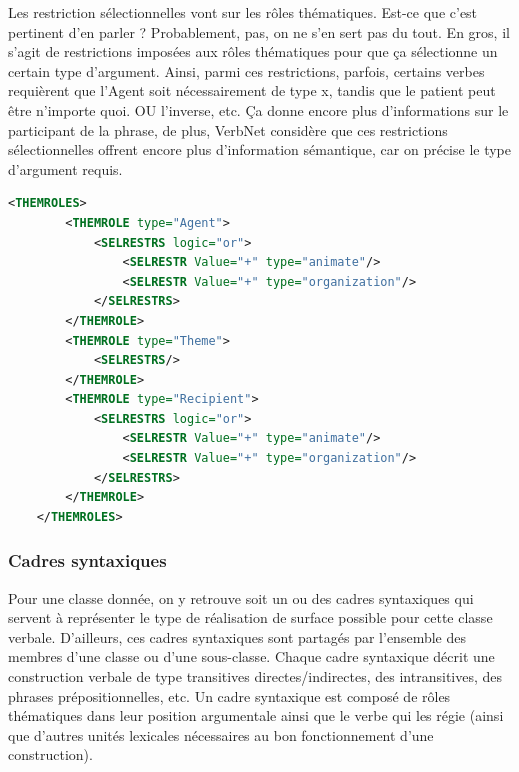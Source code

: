 Les restriction sélectionnelles vont sur les rôles thématiques. Est-ce que c'est pertinent d'en parler ? Probablement, pas, on ne s'en sert pas du tout.
En gros, il s'agit de restrictions imposées aux rôles thématiques pour que ça sélectionne un certain type d'argument. Ainsi, parmi ces restrictions, parfois, certains verbes requièrent que l'Agent soit nécessairement de type x, tandis que le patient peut être n'importe quoi. OU l'inverse, etc.
Ça donne encore plus d'informations sur le participant de la phrase, de plus, VerbNet considère que ces restrictions sélectionnelles offrent encore plus d'information sémantique, car on précise le type d'argument requis.
\begin{lstlisting}[language=Xml, caption = les restrictions sélectionnelles]
    <THEMROLES>
        <THEMROLE type="Agent">
            <SELRESTRS logic="or">
                <SELRESTR Value="+" type="animate"/>
                <SELRESTR Value="+" type="organization"/>
            </SELRESTRS>
        </THEMROLE>
        <THEMROLE type="Theme">
            <SELRESTRS/>
        </THEMROLE>
        <THEMROLE type="Recipient">
            <SELRESTRS logic="or">
                <SELRESTR Value="+" type="animate"/>
                <SELRESTR Value="+" type="organization"/>
            </SELRESTRS>
        </THEMROLE>
    </THEMROLES>
\end{lstlisting}

\subsubsection{Cadres syntaxiques}

Pour une classe donnée, on y retrouve soit un ou des cadres syntaxiques qui servent à représenter le type de réalisation de surface possible pour cette classe verbale. D'ailleurs, ces cadres syntaxiques sont partagés par l'ensemble des membres d'une classe ou d'une sous-classe. Chaque cadre syntaxique décrit une construction verbale de type transitives directes/indirectes, des intransitives, des phrases prépositionnelles, etc. Un cadre syntaxique est composé de rôles thématiques dans leur position argumentale ainsi que le verbe qui les régie (ainsi que d'autres unités lexicales nécessaires au bon fonctionnement d'une construction).

